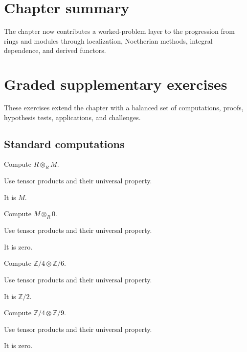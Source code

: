 \section*{Chapter summary}
The chapter now contributes a worked-problem layer to the progression from rings and modules through localization, Noetherian methods, integral dependence, and derived functors.
\section{Graded supplementary exercises}
These exercises extend the chapter with a balanced set of computations, proofs, hypothesis tests, applications, and challenges.

\subsection*{Standard computations}

\begin{exercise}\label{exr:v10-expand-01}
Compute $R\otimes_RM$.
\end{exercise}
\begin{hint}
Use tensor products and their universal property.
\end{hint}
\begin{solution}
It is $M$.
\end{solution}

\begin{exercise}\label{exr:v10-expand-02}
Compute $M\otimes_R0$.
\end{exercise}
\begin{hint}
Use tensor products and their universal property.
\end{hint}
\begin{solution}
It is zero.
\end{solution}

\begin{exercise}\label{exr:v10-expand-03}
Compute $\mathbb Z/4\otimes\mathbb Z/6$.
\end{exercise}
\begin{hint}
Use tensor products and their universal property.
\end{hint}
\begin{solution}
It is $\mathbb Z/2$.
\end{solution}

\begin{exercise}\label{exr:v10-expand-04}
Compute $\mathbb Z/4\otimes\mathbb Z/9$.
\end{exercise}
\begin{hint}
Use tensor products and their universal property.
\end{hint}
\begin{solution}
It is zero.
\end{solution}

